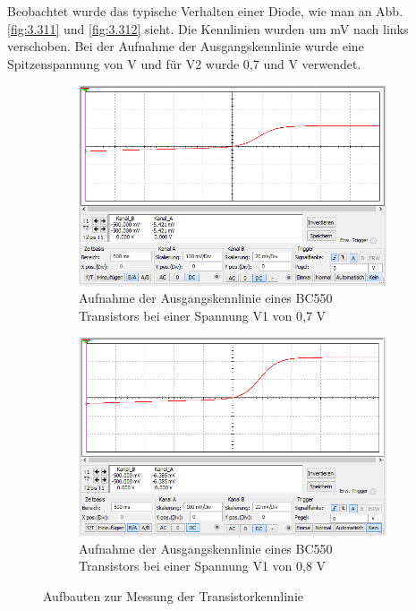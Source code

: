 \documentclass[12pt,a4paper]{article}
\begin{document}
Beobachtet wurde das typische Verhalten einer Diode, wie man an Abb. \ref{fig:3.311} und \ref{fig:3.312} sieht. Die Kennlinien wurden um \unit[480]{mV} nach links verschoben.\newline
Bei der Aufnahme der Ausgangskennlinie wurde eine Spitzenspannung von \unit[1]{V} und für V2 wurde 0,7 und \unit[0,8]{V} verwendet. 
\begin{figure}[H]
        \centering
        \begin{subfigure}[t]{0.48\textwidth}
               \includegraphics[trim = 0mm 0mm 0mm 0mm, clip, scale = 0.5]{3_3_ausgangskennlinie_0,7V.PNG}
				\caption[Aufnahme der Ausgangskennlinie eines BC550 Transistors bei einer Spannung V1 von 0,7 V]{Aufnahme der Ausgangskennlinie eines BC550 Transistors bei einer Spannung V1 von 0,7 V}
 				 \label{fig:3.321}
        \end{subfigure}%
        \hfill
        \begin{subfigure}[t]{0.48\textwidth}
                \includegraphics[trim = 0mm 0mm 0mm 0mm, clip, scale = 0.5]{3_3_ausgangskennlinie_0,8V.PNG}
  				\caption[Aufnahme der Ausgangskennlinie eines BC550 Transistors bei einer Spannung V1 von 0,8 V]{Aufnahme der Ausgangskennlinie eines BC550 Transistors bei einer Spannung V1 von 0,8 V}
  				\label{fig:3.322}
        \end{subfigure}
        \caption{Aufbauten zur Messung der Transistorkennlinie}
        \label{fig:3.32_Auswertung}
\end{figure}
\end{document}
